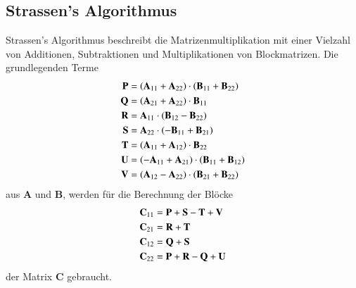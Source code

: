 \subsection{Strassen's Algorithmus}

Strassen's Algorithmus \cite{multiplikation:strassen_1969} beschreibt die Matrizenmultiplikation mit einer Vielzahl von Additionen, Subtraktionen und Multiplikationen von Blockmatrizen.
Die grundlegenden Terme
\begin{equation} \label{multiplikation:eq:strassen}
\begin{split}
\text{\textbf{P}}   &= \left(\mathbf{A}_{11} + \mathbf{A}_{22}\right ) \cdot \left(\mathbf{B}_{11} + \mathbf{B}_{22}\right ) \\
\text{\textbf{Q}}  &= \left(\mathbf{A}_{21} + \mathbf{A}_{22}\right ) \cdot \mathbf{B}_{11} \\
\text{\textbf{R}} &= \mathbf{A}_{11} \cdot \left(\mathbf{B}_{12}-\mathbf{B}_{22}\right ) \\
\text{\textbf{S}}  &= \mathbf{A}_{22} \cdot \left(-\mathbf{B}_{11}+\mathbf{B}_{21}\right ) \\
\text{\textbf{T}}   &= \left(\mathbf{A}_{11} + \mathbf{A}_{12}\right ) \cdot \mathbf{B}_{22} \\
\text{\textbf{U}}  &= \left(-\mathbf{A}_{11} + \mathbf{A}_{21}\right ) \cdot \left(\mathbf{B}_{11} + \mathbf{B}_{12}\right ) \\
\text{\textbf{V}} &= \left(\mathbf{A}_{12} - \mathbf{A}_{22}\right ) \cdot \left(\mathbf{B}_{21} + \mathbf{B}_{22}\right )
\end{split}
\end{equation}
aus $\mathbf{A}$ und $\mathbf{B}$, werden f\"ur die Berechnung der Bl\"ocke
\begin{equation} \label{multiplikation:eq:strassen2}
\begin{split}
\mathbf{C}_{11} &= \text{\textbf{P}} + \text{\textbf{S}} - \text{\textbf{T}} + \text{\textbf{V}} \\
\mathbf{C}_{21} &= \text{\textbf{R}} + \text{\textbf{T}} \\
\mathbf{C}_{12} &= \text{\textbf{Q}} + \text{\textbf{S}}\\
\mathbf{C}_{22} &= \text{\textbf{P}} + \text{\textbf{R}} - \text{\textbf{Q}} + \text{\textbf{U}}
\end{split}
\end{equation}
der Matrix $\mathbf{C}$ gebraucht.
